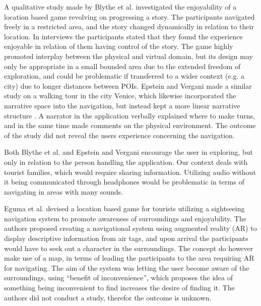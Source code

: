 A qualitative study made by Blythe et al. investigated the enjoyability of a location based game revolving on progressing a story\cite{InterdisciplinaryCriticism}. The participants navigated freely in a restricted area, and the story changed dynamically in relation to their location. In interviews the participants stated that they found the experience enjoyable in relation of them having control of the story. The game highly promoted interplay between the physical and virtual domain, but its design may only be appropriate in a small bounded area due to the extended freedom of exploration, and could be problematic if transferred to a wider context (e.g. a city) due to longer distances between POIs. Epstein and Vergani made a similar study on a walking tour in the city Venice, which likewise incorporated the narrative space into the navigation, but instead kept a more linear narrative structure \cite{MobileTechnologies}. A narrator in the application verbally explained where to make turns, and in the same time made comments on the physical environment. The outcome of the study did not reveal the users experience concerning the navigation.

Both Blythe et al. and Epstein and Vergani encourage the user in exploring, but only in relation to the person handling the application. Our context deals with tourist families, which would require sharing information. Utilizing audio without it being communicated through headphones would be problematic in terms of navigating in areas with many sounds. 

Eguma et al. devised a location based game for tourists utilizing a sightseeing navigation system to promote awareness of surroundings and enjoyability\cite{HideAndSeek}.  The authors proposed creating a navigational system using augmented reality (AR) to display descriptive information from air tags, and upon arrival the participants would have to seek out a character in the surroundings. The concept do however make use of a map, in terms of leading the participants to the area requiring AR for navigating.  The aim of the system was letting the user become aware of the surroundings, using “benefit of inconvenience”, which proposes the idea of something being inconvenient to find increases the desire of finding it. The authors did not conduct a study, therefor the outcome is unknown.

